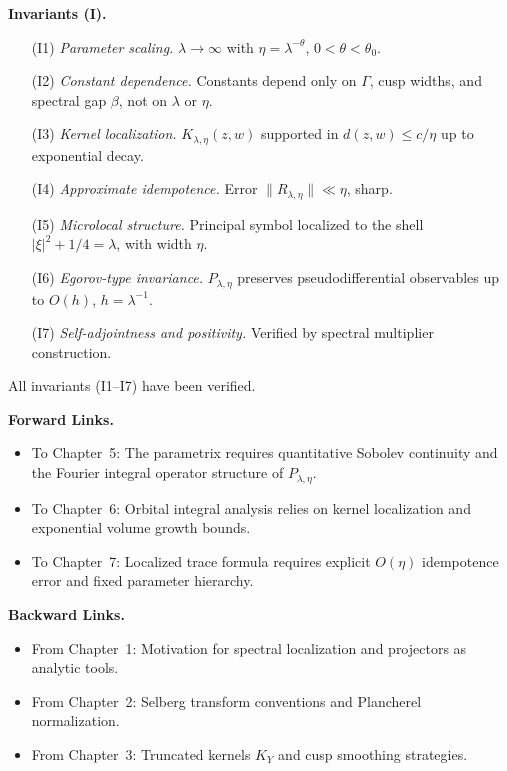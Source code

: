 \medskip
\noindent\textbf{Invariants (I).}
\begin{itemize}
  \item[(I1)] \emph{Parameter scaling.} $\lambda\to\infty$ with $\eta=\lambda^{-\theta}$, $0<\theta<\theta_{0}$.  
  \item[(I2)] \emph{Constant dependence.} Constants depend only on $\Gamma$, cusp widths, and spectral gap $\beta$, not on $\lambda$ or $\eta$.  
  \item[(I3)] \emph{Kernel localization.} $K_{\lambda,\eta}(z,w)$ supported in $d(z,w)\leq c/\eta$ up to exponential decay.  
  \item[(I4)] \emph{Approximate idempotence.} Error $\|R_{\lambda,\eta}\|\ll \eta$, sharp.  
  \item[(I5)] \emph{Microlocal structure.} Principal symbol localized to the shell $|\xi|^2+1/4=\lambda$, with width $\eta$.  
  \item[(I6)] \emph{Egorov-type invariance.} $P_{\lambda,\eta}$ preserves pseudodifferential observables up to $O(h)$, $h=\lambda^{-1}$.  
  \item[(I7)] \emph{Self-adjointness and positivity.} Verified by spectral multiplier construction.  
\end{itemize}
All invariants (I1–I7) have been verified.

\medskip
\noindent\textbf{Forward Links.}
\begin{itemize}
  \item To Chapter~5: The parametrix requires quantitative Sobolev continuity and the Fourier integral operator structure of $P_{\lambda,\eta}$.  
  \item To Chapter~6: Orbital integral analysis relies on kernel localization and exponential volume growth bounds.  
  \item To Chapter~7: Localized trace formula requires explicit $O(\eta)$ idempotence error and fixed parameter hierarchy.  
\end{itemize}

\medskip
\noindent\textbf{Backward Links.}
\begin{itemize}
  \item From Chapter~1: Motivation for spectral localization and projectors as analytic tools.  
  \item From Chapter~2: Selberg transform conventions and Plancherel normalization.  
  \item From Chapter~3: Truncated kernels $K_Y$ and cusp smoothing strategies.  
\end{itemize}


